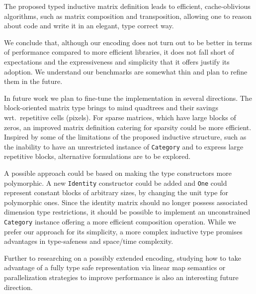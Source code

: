 \documentclass[sigplan,screen]{acmart}\settopmatter{}
\newcommand{\hs}{\texttt}
\begin{document}
The proposed typed inductive matrix definition leads to efficient, cache-oblivious algorithms, such as matrix composition and transposition, allowing one to reason about code and write it in an elegant, type correct way.

We conclude that, although our encoding does not turn out to be better in terms of performance compared to more efficient libraries, it does not fall short of expectations and the expressiveness and simplicity that it offers justify its adoption. We understand our benchmarks are somewhat thin and plan to refine them in the future.

In future work we plan to fine-tune the implementation in several directions.
The block-oriented matrix type brings to mind quadtrees \cite{samet1984quadtree} and their savings wrt.\ repetitive cells (pixels). For sparse matrices, which have large blocks of zeros, an improved matrix definition catering for sparsity could be more efficient. Inspired by some of the limitations of the proposed inductive structure, such as the inability to have an unrestricted instance of \hs{Category} and to express large repetitive blocks, alternative formulations are to be explored. 

A possible approach could be based on making the type constructors more polymorphic.
A new \hs{Identity} constructor could be added and \hs{One} could represent constant blocks of arbitrary sizes, by changing the unit type for polymorphic ones. Since the identity matrix should no longer possess associated dimension type restrictions, it should be possible to implement an unconstrained \hs{Category} instance offering a more efficient composition operation.
While we prefer our approach for its simplicity, a more complex inductive type promises advantages in type-safeness and space/time complexity.

Further to researching on a possibly extended encoding, studying how to take advantage of a fully type safe representation via linear map semantics or parallelization strategies to improve performance is also an interesting future direction.
\end{document}
